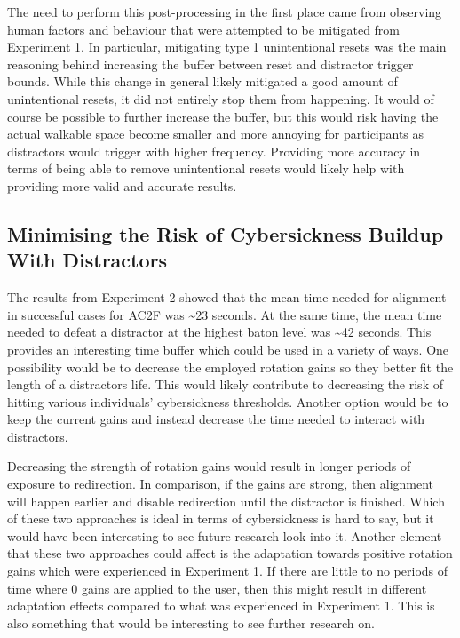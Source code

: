 The need to perform this post-processing in the first place came from observing human factors and behaviour that were attempted to be mitigated from Experiment 1. In particular, mitigating type 1 unintentional resets was the main reasoning behind increasing the buffer between reset and distractor trigger bounds. While this change in general likely mitigated a good amount of unintentional resets, it did not entirely stop them from happening. It would of course be possible to further increase the buffer, but this would risk having the actual walkable space become smaller and more annoying for participants as distractors would trigger with higher frequency. Providing more accuracy in terms of being able to remove unintentional resets would likely help with providing more valid and accurate results. 

\subsection{Minimising the Risk of Cybersickness Buildup With Distractors}\label{sec:ex2MinimisingCybersickness}

The results from Experiment 2 showed that the mean time needed for alignment in successful cases for AC2F was \textasciitilde23 seconds. At the same time, the mean time needed to defeat a distractor at the highest baton level was \textasciitilde42 seconds. This provides an interesting time buffer which could be used in a variety of ways. One possibility would be to decrease the employed rotation gains so they better fit the length of a distractors life. This would likely contribute to decreasing the risk of hitting various individuals' cybersickness thresholds. Another option would be to keep the current gains and instead decrease the time needed to interact with distractors. 

Decreasing the strength of rotation gains would result in longer periods of exposure to redirection. In comparison, if the gains are strong, then alignment will happen earlier and disable redirection until the distractor is finished. Which of these two approaches is ideal in terms of cybersickness is hard to say, but it would have been interesting to see future research look into it. Another element that these two approaches could affect is the adaptation towards positive rotation gains which were experienced in Experiment 1. If there are little to no periods of time where 0 gains are applied to the user, then this might result in different adaptation effects compared to what was experienced in Experiment 1. This is also something that would be interesting to see further research on.

